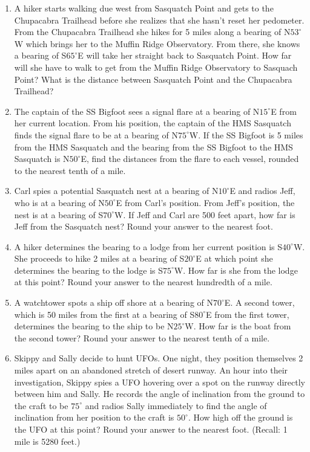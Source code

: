 \begin{enumerate}
\item A hiker starts walking due west from Sasquatch Point and gets to the Chupacabra Trailhead before she realizes that she hasn't reset her pedometer.  From the Chupacabra Trailhead she hikes for 5 miles along a bearing of N$53^{\circ}$W which brings her to the Muffin Ridge Observatory.  From there, she knows a bearing of S$65^{\circ}$E will take her straight back to Sasquatch Point.  How far will she have to walk to get from the Muffin Ridge Observatory to Sasquach Point?  What is the distance between Sasquatch Point and the Chupacabra Trailhead?

\item  The captain of the SS Bigfoot sees a signal flare at a bearing of N$15^{\circ}$E from her current location. From his position, the captain of the HMS Sasquatch finds the signal flare to be at a bearing of N$75^{\circ}$W.  If the SS Bigfoot is 5 miles from the HMS Sasquatch and the bearing from the SS Bigfoot to the HMS Sasquatch is N$50^{\circ}$E, find the distances from the flare to each vessel, rounded to the nearest tenth of a mile.

\item  Carl spies a potential Sasquatch nest at a bearing of N$10^{\circ}$E and radios Jeff, who is at a bearing of N$50^{\circ}$E from Carl's position.  From Jeff's position, the nest is at a bearing of S$70^{\circ}$W. If Jeff and Carl are 500 feet apart, how far is Jeff from the Sasquatch nest?  Round your answer to the nearest foot.

\item  A hiker determines the bearing to a lodge from her current position is S$40^{\circ}$W.  She proceeds to hike 2 miles at a bearing of S$20^{\circ}$E at which point she determines the bearing to the lodge is S$75^{\circ}$W.  How far is she from the lodge at this point?  Round your answer to the nearest hundredth of a mile.

\item  A watchtower spots a ship off shore at a bearing of N$70^{\circ}$E.  A second tower, which is 50 miles from the first at a bearing of S$80^{\circ}$E from the first tower, determines the bearing to the ship to be N$25^{\circ}$W. How far is the boat from the second tower?  Round your answer to the nearest tenth of a mile.

\item  Skippy and Sally decide to hunt UFOs.  One night, they position themselves 2 miles apart on an abandoned stretch of desert runway.  An hour into their investigation, Skippy spies a UFO hovering over a spot on the runway directly between him and Sally.  He records the angle of inclination from the ground to the craft to be $75^{\circ}$ and radios Sally immediately to find the angle of inclination from her position to the craft is $50^{\circ}$.  How high off the ground is the UFO at this point?  Round your answer to the nearest foot.  (Recall:  1 mile is 5280 feet.)


\end{enumerate}
